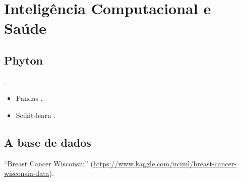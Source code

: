 \chapter{Inteligência Computacional e Saúde}
\label{chapter:inteligencia_computacional_e_saude}


\section{\textbf{Phyton}}
\cite{PYTHON}.


\begin{itemize}
\item Pandas  \cite{PANDAS}.
\item Scikit-learn \cite{SCIKIT}.
\end{itemize}

\section{\textbf{A base de dados}}
“Breast Cancer Wisconsin” (\url{https://www.kaggle.com/uciml/breast-cancer-wisconsin-data})\cite{BREASTCANCER}.


